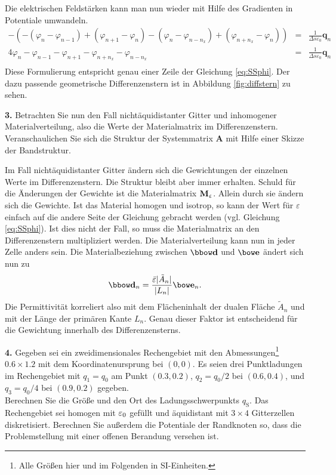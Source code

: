 \documentclass[Protokollheft.tex]{subfiles}
\begin{document}
Die elektrischen Feldstärken kann man nun wieder mit Hilfe des Gradienten in Potentiale umwandeln.
\begin{eqnarray*}
	-(-(\varphi_n-\varphi_{n-1})+(\varphi_{n+1}-\varphi_n)-(\varphi_n-\varphi_{n-n_x})+(\varphi_{n+n_x}-\varphi_n))&=&\frac{1}{\Delta s\varepsilon_0}\mathbf{q}_n\\
	4\varphi_n-\varphi_{n-1}-\varphi_{n+1}-\varphi_{n+n_x}-\varphi_{n-n_x}&=&\frac{1}{\Delta s\varepsilon_0}\mathbf{q}_n\\
\end{eqnarray*}
Diese Formulierung entspricht genau einer Zeile der Gleichung \ref{eq:SSphi}. Der dazu passende geometrische Differenzenstern ist in Abbildung \ref{fig:diffstern} zu sehen.


\begin{framed}
	\noindent \textbf{3.} Betrachten Sie nun den Fall nichtäquidistanter Gitter
und inhomogener Materialverteilung, also die Werte der Materialmatrix im
Differenzenstern. Veranschaulichen Sie sich die Struktur der Systemmatrix $\mathbf{A}$ mit Hilfe einer Skizze der Bandstruktur.\label{exer:bandsOfSystemMat}
\end{framed}
\noindent
Im Fall nichtäquidistanter Gitter ändern sich die Gewichtungen der einzelnen Werte im Differenzenstern. Die Struktur bleibt aber immer erhalten. Schuld für die Änderungen der Gewichte ist die Materialmatrix $\mathbf{M}_{\upvarepsilon}$. Allein durch sie ändern sich die Gewichte. Ist das Material homogen und isotrop, so kann der Wert für $\varepsilon$ einfach auf die andere Seite der Gleichung gebracht werden (vgl. Gleichung \ref{eq:SSphi}). Ist dies nicht der Fall, so muss die Materialmatrix an den Differenzenstern multipliziert werden. Die Materialverteilung kann nun in jeder Zelle anders sein. Die Materialbeziehung zwischen $\dfit$ und $\efit$ ändert sich nun zu
\begin{equation*}
	\dfit_n=\frac{\bar{\varepsilon}|\tilde{A}_n|}{|L_n|}\efit_{n}.
\end{equation*}
Die Permittivität korreliert also mit dem Flächeninhalt der dualen Fläche $\tilde{A}_n$ und mit der Länge der primären Kante $L_n$. Genau dieser Faktor ist entscheidend für die Gewichtung innerhalb des Differenzensterns.

\begin{framed}
	\noindent \textbf{4.} Gegeben sei ein zweidimensionales Rechengebiet mit den
Abmessungen\footnote{Alle Größen hier und im Folgenden in SI-Einheiten.} $0.6\times 1.2$ mit        
dem Koordinatenursprung bei $(0,0)$. Es seien drei Punktladungen im
Rechengebiet mit $q_1=q_0$ am Punkt $(0.3,0.2)$,  $q_2=q_0/2$ bei
$(0.6,0.4)$, und  $q_3=q_0/4$ bei $(0.9,0.2)$ gegeben.\\
Berechnen Sie die Größe und den Ort des Ladungsschwerpunkts $q_{\text{S}}$. Das
Rechengebiet sei homogen mit $\varepsilon_0$ gefüllt und äquidistant mit
$3 \times 4$ Gitterzellen diskretisiert. Berechnen Sie außerdem die
Potentiale der Randknoten so, dass die Problemstellung mit einer
offenen Berandung versehen ist.\label{exer:averagePointCharges}
\end{framed}
\end{document}
